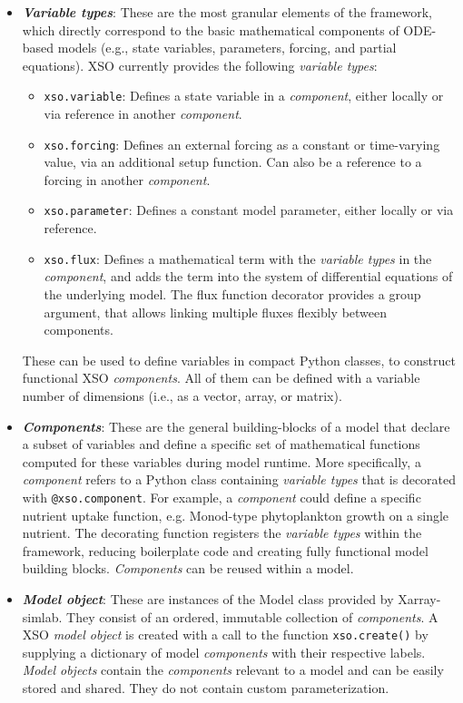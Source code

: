 \documentclass[journal abbreviation, manuscript]{copernicus}
\begin{document}
\begin{itemize}
    \item  \textbf{\textit{Variable types}}: These are the most granular elements of the framework, which directly correspond to the basic mathematical components of ODE-based models (e.g., state variables, parameters, forcing, and partial equations). XSO currently provides the following \textit{variable types}: 
    \begin{itemize}
        \item \texttt{xso.variable}: Defines a state variable in a \textit{component}, either locally or via reference in another \textit{component}.
        \item \texttt{xso.forcing}: Defines an external forcing as a constant or time-varying value, via an additional setup function. Can also be a reference to a forcing in another \textit{component}.
        \item \texttt{xso.parameter}: Defines a constant model parameter, either locally or via reference.
        \item \texttt{xso.flux}: Defines a mathematical term with the \textit{variable types} in the \textit{component}, and adds the term into the system of differential equations of the underlying model. The flux function decorator provides a group argument, that allows linking multiple fluxes flexibly between components.
    \end{itemize}
    These can be used to define variables in compact Python classes, to construct functional XSO \textit{components}. All of them can be defined with a variable number of dimensions (i.e., as a vector, array, or matrix).

    \item \textbf{\textit{Components}}: These are the general building-blocks of a model that declare a subset of variables and define a specific set of mathematical functions computed for these variables during model runtime. More specifically, a \textit{component} refers to a Python class containing \textit{variable types} that is decorated with \texttt{@xso.component}. For example, a \textit{component} could define a specific nutrient uptake function, e.g. Monod-type phytoplankton growth on a single nutrient. The decorating function registers the \textit{variable types} within the framework, reducing boilerplate code and creating fully functional model building blocks. \textit{Components} can be reused within a model.
    
    \item \textbf{\textit{Model object}}: These are instances of the Model class provided by Xarray-simlab. They consist of an ordered, immutable collection of \textit{components}. A XSO \textit{model object} is created with a call to the function \texttt{xso.create()} by supplying a dictionary of model \textit{components} with their respective labels. \textit{Model objects} contain the \textit{components} relevant to a model and can be easily stored and shared. They do not contain custom parameterization.


\end{itemize}
\end{document}

